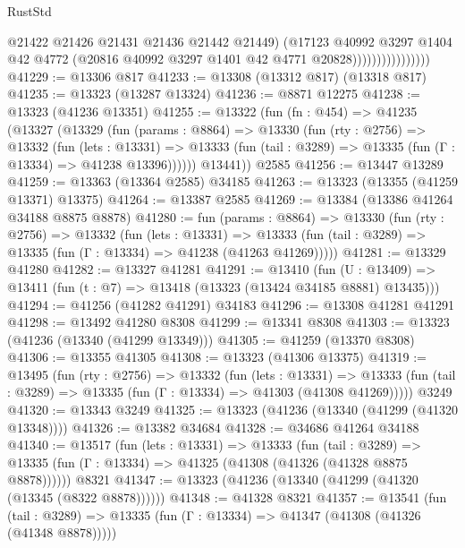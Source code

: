 \begin{lexlean}{RustStd}
\begin{coremodule}
                                  @21422
                                  @21426
                                  @21431
                                  @21436
                                  @21442
                                  @21449)
                                (@17123
                                  @40992
                                  @3297
                                  @1404
                                  @42
                                  @4772
                                  (@20816 @40992 @3297 @1401 @42 @4771 @20828))))))))))))))))
@41229 := @13306 @817
@41233 := @13308 (@13312 @817) (@13318 @817)
@41235 := @13323 (@13287 @13324)
@41236 := @8871 @12275
@41238 := @13323 (@41236 @13351)
@41255 := @13322
    (fun (fn : @454) =>
    @41235
      (@13327
        (@13329
          (fun (params : @8864) =>
          @13330
            (fun (rty : @2756) =>
            @13332
              (fun (lets : @13331) =>
              @13333 (fun (tail : @3289) => @13335 (fun (Γ : @13334) => @41238 @13396))))))
        @13441))
    @2585
@41256 := @13447 @13289
@41259 := @13363 (@13364 @2585) @34185
@41263 := @13323 (@13355 (@41259 @13371) @13375)
@41264 := @13387 @2585
@41269 := @13384 (@13386 @41264 @34188 @8875 @8878)
@41280 := fun (params : @8864) =>
  @13330
    (fun (rty : @2756) =>
    @13332
      (fun (lets : @13331) =>
      @13333 (fun (tail : @3289) => @13335 (fun (Γ : @13334) => @41238 (@41263 @41269)))))
@41281 := @13329 @41280
@41282 := @13327 @41281
@41291 := @13410
    (fun (U : @13409) => @13411 (fun (t : @7) => @13418 (@13323 (@13424 @34185 @8881) @13435)))
@41294 := @41256 (@41282 @41291) @34183
@41296 := @13308 @41281 @41291
@41298 := @13492 @41280 @8308
@41299 := @13341 @8308
@41303 := @13323 (@41236 (@13340 (@41299 @13349)))
@41305 := @41259 (@13370 @8308)
@41306 := @13355 @41305
@41308 := @13323 (@41306 @13375)
@41319 := @13495
    (fun (rty : @2756) =>
    @13332
      (fun (lets : @13331) =>
      @13333 (fun (tail : @3289) => @13335 (fun (Γ : @13334) => @41303 (@41308 @41269)))))
    @3249
@41320 := @13343 @3249
@41325 := @13323 (@41236 (@13340 (@41299 (@41320 @13348))))
@41326 := @13382 @34684
@41328 := @34686 @41264 @34188
@41340 := @13517
    (fun (lets : @13331) =>
    @13333
      (fun (tail : @3289) =>
      @13335 (fun (Γ : @13334) => @41325 (@41308 (@41326 (@41328 @8875 @8878))))))
    @8321
@41347 := @13323 (@41236 (@13340 (@41299 (@41320 (@13345 (@8322 @8878))))))
@41348 := @41328 @8321
@41357 := @13541
    (fun (tail : @3289) => @13335 (fun (Γ : @13334) => @41347 (@41308 (@41326 (@41348 @8878)))))

\end{coremodule}
\end{lexlean}
